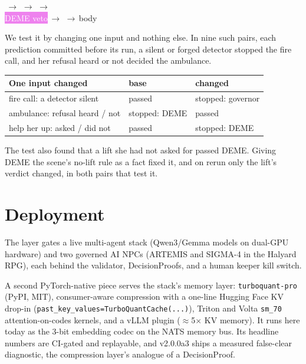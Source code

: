 \documentclass[11pt,twocolumn]{extarticle}
\begin{document}
\begin{center}\footnotesize
\parbox{\linewidth}{\centering\setlength{\fboxsep}{2pt}%
\,$\to$\,\,$\to$\,\,$\to$\\[3pt]
\colorbox{violet}{\textcolor{white}{DEME veto}}\,$\to$\,\,$\to$\,body}
\end{center}

We test it by changing one input and nothing else. In nine such pairs, each prediction
committed before its run, a silent or forged detector stopped the fire call, and her
refusal heard or not decided the ambulance.

\begin{center}\footnotesize\setlength{\tabcolsep}{4pt}
\begin{tabular}{@{}>{\raggedright\arraybackslash}p{1.4in}ll@{}}
\textbf{One input changed} & \textbf{base} & \textbf{changed}\\\hline
fire call: a detector silent & passed & stopped: governor\\
ambulance: refusal heard / not & stopped: DEME & passed\\
help her up: asked / did not & passed & stopped: DEME\\
\end{tabular}
\end{center}

The test also found that a lift she had not asked for passed DEME. Giving DEME the
scene's no-lift rule as a fact fixed it, and on rerun only the lift's verdict changed, in
both pairs that test it.

\section{Deployment}
The layer gates a live multi-agent stack (Qwen3/Gemma models on dual-GPU hardware) and two
governed AI NPCs (ARTEMIS and SIGMA-4 in the Halyard RPG), each behind the validator,
DecisionProofs, and a human keeper kill switch.

A second PyTorch-native piece serves the stack's memory layer: \texttt{turboquant-pro}
(PyPI, MIT), consumer-aware compression with a one-line Hugging Face KV drop-in
(\texttt{past\_key\_values=TurboQuantCache(...)}), Triton and Volta \texttt{sm\_70}
attention-on-codes kernels, and a vLLM plugin ($\approx$5$\times$ KV memory). It runs here
today as the 3-bit embedding codec on the NATS memory bus. Its headline numbers are
CI-gated and replayable, and v2.0.0a3 ships a measured false-clear diagnostic, the
compression layer's analogue of a DecisionProof.
\end{document}

